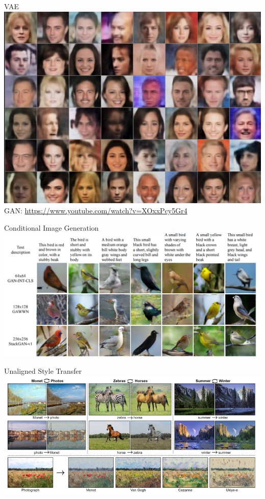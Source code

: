 \documentclass{beamer}
\begin{document}
\begin{frame}
\begin{center}
\end{center}
\center
VAE\\
\includegraphics[scale=0.3]{vae-faces}
\\
GAN: \url{https://www.youtube.com/watch?v=XOxxPcy5Gr4}

\end{frame}

\begin{frame}
\begin{center}
\end{center}
\center
Conditional Image Generation
\includegraphics[scale=0.3]{stackgan}
\end{frame}

\begin{frame}
\begin{center}
\end{center}
\center
Unaligned Style Transfer
\includegraphics[scale=0.35]{cyclegan}
\end{frame}
\end{document}
